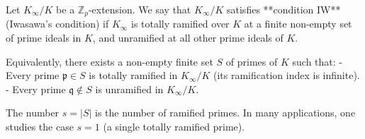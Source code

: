Let $K_\infty / K$ be a $\mathbb{Z}_p$-extension. We say that $K_\infty / K$ satisfies **condition IW** (Iwasawa's condition) if $K_\infty$ is totally ramified over $K$ at a finite non-empty set of prime ideals in $K$, and unramified at all other prime ideals of $K$.

Equivalently, there exists a non-empty finite set $S$ of primes of $K$ such that:
- Every prime $\mathfrak{p} \in S$ is totally ramified in $K_\infty / K$ (its ramification index is infinite).
- Every prime $\mathfrak{q} \notin S$ is unramified in $K_\infty / K$.

The number $s = |S|$ is the number of ramified primes. In many applications, one studies the case $s = 1$ (a single totally ramified prime).
